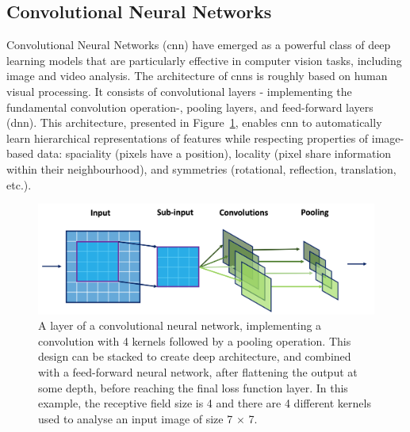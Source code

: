 \subsection{Convolutional Neural Networks}
Convolutional Neural Networks (\gls{cnn}) \cite{NIPS198953c3bce6, NIPS2012_c399862d} have emerged as a powerful class of deep learning models that are particularly effective in computer vision tasks, including image and video analysis. The architecture of \gls{cnn}s is roughly based on human visual processing. It consists of convolutional layers - implementing the fundamental convolution operation-, pooling layers, and feed-forward layers (\gls{dnn}). This architecture, presented in Figure~\ref{fig:cnnDesign}, enables \gls{cnn} to automatically learn hierarchical representations of features while respecting properties of image-based data: spaciality (pixels have a position), locality (pixel share information within their neighbourhood), and symmetries (rotational, reflection, translation, etc.).

\begin{figure}[h!]
    \center
    \includegraphics[scale=0.5]{Images/ML/cnn.png}
    \caption{A layer of a convolutional neural network, implementing a convolution with 4 kernels followed by a pooling operation. This design can be stacked to create deep architecture, and combined with a feed-forward neural network, after flattening the output at some depth, before reaching the final loss function layer. In this example, the receptive field size is 4 and there are 4 different kernels used to analyse an input image of size 7 $\times$ 7.} 
    \label{fig:cnnDesign}
\end{figure}

